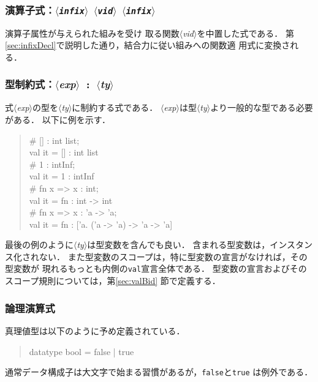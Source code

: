 \documentclass{jbook}
\newcommand{\code}[1]{\mbox{\large\tt #1}}
\newcommand{\nonterm}[1]{\mbox{$\langle$}{\it #1}\mbox{$\rangle$}}
\newcommand{\term}[1]{\mbox{{\tt #1}}}
\newenvironment{program}{\begin{quote}\begin{tt}}%
                        {\end{tt}\end{quote}}
\begin{document}
\subsubsection{演算子式：\term{\nonterm{infix}\ \nonterm{vid} \nonterm{infix}}}

	演算子属性が与えられた組みを受け
取る関数\nonterm{vid}を中置した式である．
	第\ref{sec:infixDecl}で説明した通り，結合力に従い組みへの関数適
用式に変換される．

\subsubsection{型制約式：\nonterm{exp}\ \term{:}\ \nonterm{ty}}

	式\nonterm{exp}の型を\nonterm{ty}に制約する式である．
	\nonterm{exp}は型\nonterm{ty}より一般的な型である必要がある．
	以下に例を示す．
\begin{program}
\# [] : int list;
\\
val it = [] : int list
\\
\# 1 : intInf;
\\
val it = 1 : intInf
\\
\# fn x => x : int;
\\
val it = fn : int -> int
\\
\# fn x => x : 'a -> 'a;
\\
val it = fn : ['a. ('a -> 'a) -> 'a -> 'a]
\end{program}
	最後の例のように\nonterm{ty}は型変数を含んでも良い．
	含まれる型変数は，インスタンス化されない．
	また型変数のスコープは，特に型変数の宣言がなければ，その型変数が
現れるもっとも内側の\code{val}宣言全体である．
	型変数の宣言およびそのスコープ規則については，第\ref{sec:valBid}
節で定義する．

\subsubsection{論理演算式}

	真理値型は以下のように予め定義されている．
\begin{program}
datatype bool = false | true
\end{program}
通常データ構成子は大文字で始まる習慣があるが，\code{false}と\code{true}
は例外である．
\end{document}
